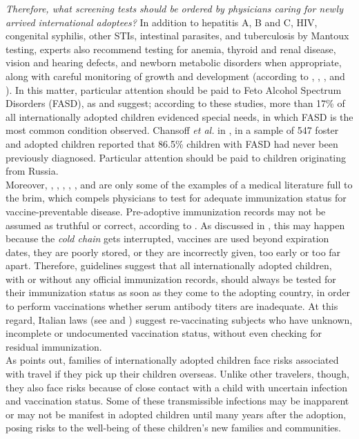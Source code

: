 \textit{Therefore, what screening tests should be ordered by physicians caring for newly arrived international adoptees?} In addition to hepatitis A, B and C, HIV, congenital syphilis, other STIs, intestinal parasites, and tuberculosis by Mantoux testing, experts also recommend testing for anemia, thyroid and renal disease, vision and hearing defects, and newborn metabolic disorders when appropriate, along with careful monitoring of growth and development (according to \cite{caringfor}, \cite{medicalscreening}, \cite{notonlyinfectious}, and \cite{nonsoloinfezioni}). In this matter, particular attention should be paid to Feto Alcohol Spectrum Disorders (FASD), as \cite{notonlyinfectious} and \cite{nonsoloinfezioni} suggest; according to these studies, more than 17\% of all internationally adopted children evidenced special needs, in which FASD is the most common condition observed. Chansoff \textit{et al.} in \cite{misdiagnosis}, in a sample of 547 foster and adopted children reported that 86.5\% children with FASD had never been previously diagnosed. Particular attention should be paid to children originating from Russia.\\
Moreover, \cite{caringfor}, \cite{medicalscreening}, \cite{initialeval}, \cite{immunizationstatus}, \cite{comphealtheval}, and \cite{immunizationstillinsufficient} are only some of the examples of a medical literature full to the brim, which compels physicians to test for adequate immunization status for vaccine-preventable disease. Pre-adoptive immunization records may not be assumed as truthful or correct, according to \cite{immunizationstatus}. As discussed in \cite{comphealtheval}, this may happen because the \textit{cold chain} gets interrupted, vaccines are used beyond expiration dates, they are poorly stored, or they are incorrectly given, too early or too far apart. Therefore, guidelines suggest that all internationally adopted children, with or without any official immunization records, should always be tested for their immunization status as soon as they come to the adopting country, in order to perform vaccinations whether serum antibody titers are inadequate. At this regard, Italian laws (see \cite{circolareministeriale} and \cite{centroprevenzione}) suggest re-vaccinating subjects who have unknown, incomplete or undocumented vaccination status, without even checking for residual immunization.\\
As \cite{preventing} points out, families of internationally adopted children face risks associated with travel if they pick up their children overseas. Unlike other travelers, though, they also face risks because of close contact with a child with uncertain infection and vaccination status. Some of these transmissible infections may be inapparent or may not be manifest in adopted children until many years after the adoption, posing risks to the well-being of these children's new families and communities.

